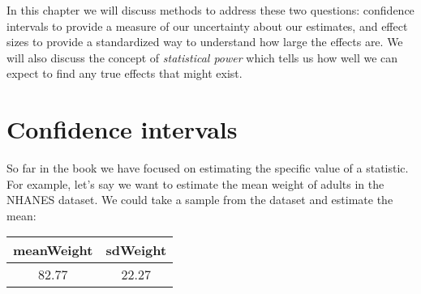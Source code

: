 \documentclass[]{book}
\newenvironment{Shaded}{\begin{snugshade}}{\end{snugshade}}
\newcommand{\KeywordTok}[1]{\textcolor[rgb]{0.13,0.29,0.53}{\textbf{#1}}}
\newcommand{\DataTypeTok}[1]{\textcolor[rgb]{0.13,0.29,0.53}{#1}}
\newcommand{\DecValTok}[1]{\textcolor[rgb]{0.00,0.00,0.81}{#1}}
\newcommand{\StringTok}[1]{\textcolor[rgb]{0.31,0.60,0.02}{#1}}
\newcommand{\CommentTok}[1]{\textcolor[rgb]{0.56,0.35,0.01}{\textit{#1}}}
\newcommand{\OperatorTok}[1]{\textcolor[rgb]{0.81,0.36,0.00}{\textbf{#1}}}
\newcommand{\NormalTok}[1]{#1}
\theoremstyle{definition}
\theoremstyle{definition}
\theoremstyle{definition}
\theoremstyle{remark}
\begin{document}
In this chapter we will discuss methods to address these two questions:
confidence intervals to provide a measure of our uncertainty about our
estimates, and effect sizes to provide a standardized way to understand
how large the effects are. We will also discuss the concept of
\emph{statistical power} which tells us how well we can expect to find
any true effects that might exist.

\section{Confidence intervals}\label{confidence-intervals-1}

So far in the book we have focused on estimating the specific value of a
statistic. For example, let's say we want to estimate the mean weight of
adults in the NHANES dataset. We could take a sample from the dataset
and estimate the mean:

\begin{Shaded}
\end{Shaded}

\begin{longtable}[]{@{}cc@{}}
\toprule
\begin{minipage}[b]{0.17\columnwidth}\centering\strut
meanWeight\strut
\end{minipage} & \begin{minipage}[b]{0.13\columnwidth}\centering\strut
sdWeight\strut
\end{minipage}\tabularnewline
\midrule
\endhead
\begin{minipage}[t]{0.17\columnwidth}\centering\strut
82.77\strut
\end{minipage} & \begin{minipage}[t]{0.13\columnwidth}\centering\strut
22.27\strut
\end{minipage}\tabularnewline
\bottomrule
\end{longtable}
\end{document}
